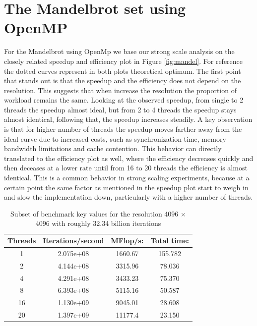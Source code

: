 \section{The Mandelbrot set using OpenMP}
For the Mandelbrot using OpenMp we base our strong scale analysis on the closely related speedup and efficiency plot in Figure \ref{fig:mandel}. For reference the dotted curves represent in both plots theoretical optimum. The first point that stands out is that the speedup and the efficiency does not depend on the resolution.
This suggests that when increase the resolution the proportion of workload remains the same.
Looking at the observed speedup, from single to 2 threads the speedup almost ideal, but from 2 to 4 threads the speedup stays almost identical, following that, the speedup increases steadily.
A key observation is that for higher number of threads the speedup moves farther away from the ideal curve due to increased costs, such as synchronization time, memory bandwidth limitations and cache contention.
This behavior can directly translated to the efficiency plot as well, where the efficiency decreases quickly and then deceases at a lower rate until from 16 to 20 threads the efficiency is almost identical.
This is a common behavior in strong scaling experiments, because at a certain point the same factor as mentioned in the speedup plot start to weigh in and slow the implementation down, particularly with a higher number of threads.
\begin{table}[H]
\centering
\begin{tabular}{|c|c|c|c|}
\hline
\textbf{Threads} & \textbf{Iterations/second} & \textbf{MFlop/s:} & \textbf{Total time:} \\ \hline
1                & 2.075e+08                  & 1660.67           & 155.782              \\
2                & 4.144e+08                  & 3315.96           & 78.036               \\
4                & 4.291e+08                  & 3433.23           & 75.370               \\
8                & 6.393e+08                  & 5115.16           & 50.587               \\
16               & 1.130e+09                  & 9045.01           & 28.608               \\
20               & 1.397e+09                  & 11177.4           & 23.150               \\ \hline
\end{tabular}
\caption{Subset of benchmark key values for the resolution 4096 $\times$ 4096 with roughly 32.34 billion iterations}
\label{tab:mandel-bench}
\end{table}

